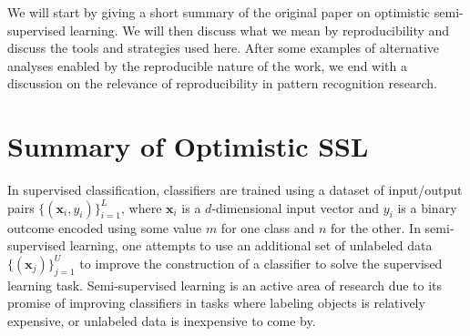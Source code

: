 \documentclass[runningheads,a4paper]{llncs}\usepackage[]{graphicx}\usepackage[]{color}
\begin{document}
We will start by giving a short summary of the original paper on optimistic semi-supervised learning. We will then discuss what we mean by reproducibility and discuss the tools and strategies used here. After some examples of alternative analyses enabled by the reproducible nature of the work, we end with a discussion on the relevance of reproducibility in pattern recognition research.

\section{Summary of Optimistic SSL}
In supervised classification, classifiers are trained using a dataset of input/output pairs $\{(\mathbf{x}_i,y_i)\}^L_{i=1}$, where $\mathbf{x}_i$ is a $d$-dimensional input vector and $y_i$ is a binary outcome encoded using some value $m$ for one class and $n$ for the other. In semi-supervised learning, one attempts to use an additional set of unlabeled data $\{(\mathbf{x}_j)\}^U_{j=1}$ to improve the construction of a classifier to solve the supervised learning task. Semi-supervised learning is an active area of research due to its promise of improving classifiers in tasks where labeling objects is relatively expensive, or unlabeled data is inexpensive to come by.
\end{document}
